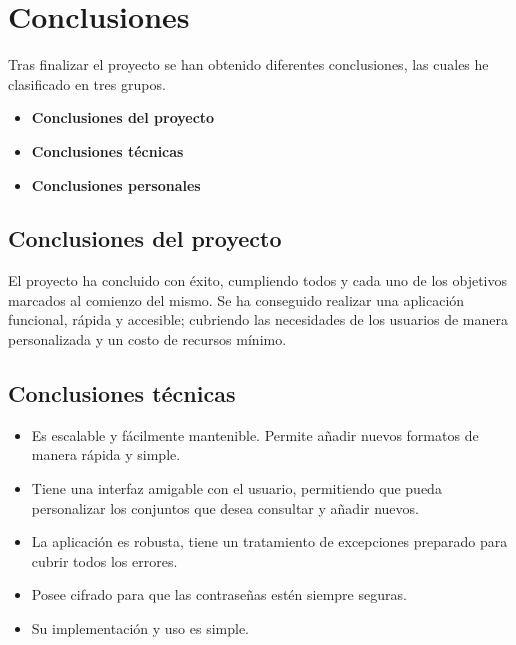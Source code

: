 \begin{comment}
Todo proyecto debe incluir las conclusiones que se derivan de su desarrollo. Éstas pueden ser de diferente índole, dependiendo de la tipología del proyecto, pero normalmente van a estar presentes un conjunto de conclusiones relacionadas con los resultados del proyecto y un conjunto de conclusiones técnicas. 
Además, resulta muy útil realizar un informe crítico indicando cómo se puede mejorar el proyecto, o cómo se puede continuar trabajando en la línea del proyecto realizado. 
\end{comment}

\section{Conclusiones}

Tras finalizar el proyecto se han obtenido diferentes conclusiones, las cuales he clasificado en tres grupos.
\begin{itemize}
    \item \textbf{Conclusiones del proyecto}
    \item \textbf{Conclusiones técnicas}
    \item \textbf{Conclusiones personales}
\end{itemize}

\subsection{Conclusiones del proyecto}
El proyecto ha concluido con éxito, cumpliendo todos y cada uno de los objetivos marcados al comienzo del mismo. Se ha conseguido realizar una aplicación funcional, rápida y accesible; cubriendo las necesidades de los usuarios de manera personalizada y un costo de recursos mínimo.

\subsection{Conclusiones técnicas}
\begin{itemize}
    \item Es escalable y fácilmente mantenible. Permite añadir nuevos formatos de manera rápida y simple.
    \item Tiene una interfaz amigable con el usuario, permitiendo que pueda personalizar los conjuntos que desea consultar y añadir nuevos. 
    \item La aplicación es robusta, tiene un tratamiento de excepciones preparado para cubrir todos los errores. 
    \item Posee cifrado para que las contraseñas estén siempre seguras.
    \item Su implementación y uso es simple.
\end{itemize}

